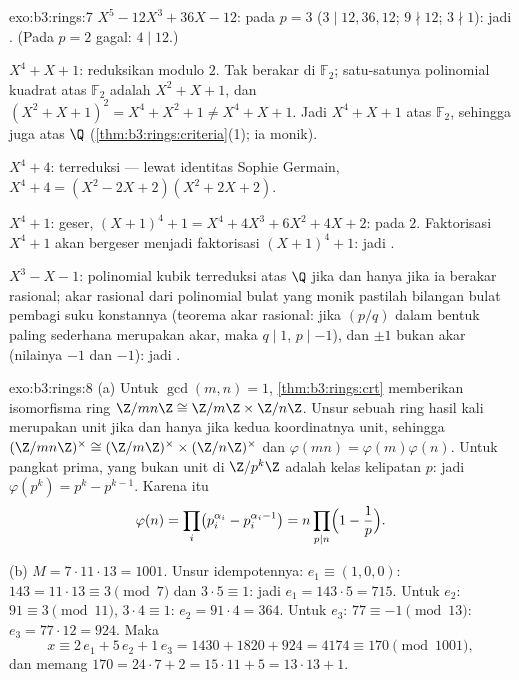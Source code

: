 \begin{solution}{exo:b3:rings:7}
\emph{$X^5 - 12X^3 + 36X - 12$}:  pada $p = 3$ ($3 \mid
12, 36, 12$; $9 \nmid 12$; $3 \nmid 1$): jadi . (Pada $p = 2$
 gagal: $4 \mid 12$.)

\emph{$X^4 + X + 1$}: reduksikan modulo $2$. Tak berakar di $\mathbb F_2$;
satu-satunya polinomial kuadrat  atas $\mathbb F_2$ adalah $X^2 + X +
1$, dan $(X^2+X+1)^2 = X^4 + X^2 + 1 \neq X^4 + X + 1$. Jadi $X^4 +
X + 1$  atas $\mathbb F_2$, sehingga juga atas $\Q$
(\cref{thm:b3:rings:criteria}(1); ia monik).

\emph{$X^4 + 4$}: terreduksi --- lewat identitas Sophie Germain,
$X^4 + 4 = (X^2 - 2X + 2)(X^2 + 2X + 2)$.

\emph{$X^4 + 1$}: geser, $(X+1)^4 + 1 = X^4 + 4X^3 + 6X^2 + 4X +
2$:  pada $2$. Faktorisasi $X^4+1$ akan bergeser menjadi
faktorisasi $(X+1)^4 + 1$: jadi .

\emph{$X^3 - X - 1$}: polinomial kubik terreduksi atas $\Q$ jika dan hanya jika ia berakar
rasional; akar rasional dari polinomial bulat yang monik pastilah
bilangan bulat pembagi suku konstannya (teorema akar rasional: jika
$(p/q)$ dalam bentuk paling sederhana merupakan akar, maka $q \mid 1$, $p \mid -1$), dan
$\pm 1$ bukan akar (nilainya $-1$ dan $-1$): jadi .
\end{solution}

\begin{solution}{exo:b3:rings:8}
(a) Untuk $\gcd(m, n) = 1$, \cref{thm:b3:rings:crt} memberikan
isomorfisma ring $\Z/mn\Z \cong \Z/m\Z \times \Z/n\Z$. Unsur sebuah
ring hasil kali merupakan unit jika dan hanya jika kedua koordinatnya unit, sehingga
$(\Z/mn\Z)^\times \cong (\Z/m\Z)^\times \times (\Z/n\Z)^\times$
dan $\varphi(mn) = \varphi(m)\varphi(n)$. Untuk pangkat prima,
yang bukan unit di $\Z/p^k\Z$ adalah kelas kelipatan $p$:
jadi $\varphi(p^k) = p^k - p^{k-1}$. Karena itu
\[
\varphi(n) = \prod_i \bigl(p_i^{\alpha_i} -
p_i^{\alpha_i-1}\bigr) = n \prod_{p \mid n}\Bigl(1 -
\frac1p\Bigr).
\]

(b) $M = 7 \cdot 11 \cdot 13 = 1001$. Unsur idempotennya: $e_1 \equiv
(1, 0, 0)$: $143 = 11\cdot13 \equiv 3 \pmod 7$ dan $3 \cdot 5
\equiv 1$: jadi $e_1 = 143 \cdot 5 = 715$. Untuk $e_2$: $91 \equiv 3
\pmod{11}$, $3 \cdot 4 \equiv 1$: $e_2 = 91\cdot4 = 364$. Untuk $e_3$:
$77 \equiv -1 \pmod{13}$: $e_3 = 77 \cdot 12 = 924$. Maka
\[
x \equiv 2\,e_1 + 5\,e_2 + 1\,e_3 = 1430 + 1820 + 924 = 4174
\equiv 170 \pmod{1001},
\]
dan memang $170 = 24\cdot7 + 2 = 15\cdot11 + 5 = 13\cdot13 + 1$.
\end{solution}

